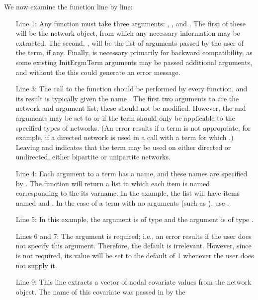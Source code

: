 \documentclass[article]{jss}
\begin{document}
We now examine the  function line by line:
\begin{itemize}
\item[Line 1:]
Any  function must take three arguments: 
, , and .  The first of these will be the network object, from
which any necessary information may be extracted.  The second, ,
will be the list of arguments passed by the user of the term, if any.  Finally, 
is necessary primarily for backward compatibility, as some existing InitErgmTerm arguments may
be passed additional arguments, and without the  this could generate an error message.
\item[Line 3:] 
The call to the  function should be performed by every 
 function, and its result is typically given the name .  
The first two arguments to  are the network and argument list; these
should not be modified.  However, the  and  arguments may
be set to  or  if the term should only be applicable to the specified 
types of networks.  (An error results if a term is not appropriate, for example, if a directed network
is used in a call with a term for which .)  Leaving 
and  indicates that the term may be used on either directed or 
undirected, either bipartite or unipartite networks.
\item[Line 4:]  Each argument to a term has a name, and these names are
specified by .  The 
function will return a list in which each item is named corresponding to the its varname.
In the example, the list will have items named  and .
In the case of a term with no arguments (such as ), use 
.
\item[Line 5:] In this example, the argument  is of type
 and the argument  is of type .
\item[Lines 6 and 7:] The  argument is required; i.e., an error results
if the user does not specify this argument.  Therefore, the default  is
irrelevant.  However, since  is not required, its value will be set to the 
default of 1 whenever the user does not supply it.
\item[Line 9:] This line extracts a vector of nodal covariate 
values from the network object.  The name of this covariate was passed in by the

\end{itemize}
\end{document}
